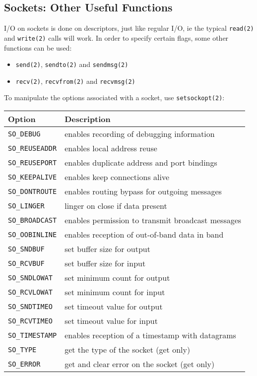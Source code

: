\documentclass[xga]{xdvislides}
\begin{document}
\subsection{Sockets: Other Useful Functions}

I/O on sockets is done on descriptors, just like regular I/O, ie the typical
{\tt read(2)} and {\tt write(2)} calls will work.  In order to specify certain
flags, some other functions can be used:

\begin{itemize}
	\item {\tt send(2)}, {\tt sendto(2)} and {\tt sendmsg(2)}
	\item {\tt recv(2)}, {\tt recvfrom(2)} and {\tt recvmsg(2)}
\end{itemize}
To manipulate the options associated with a socket, use {\tt setsockopt(2)}:
\small
\begin{tabular}{| l | l |}
	\hline
	{\bf Option}		&	{\bf Description} \\
	\hline
	{\tt SO\_DEBUG}		&	enables recording of debugging information \\
	{\tt SO\_REUSEADDR}	&	enables local address reuse \\
	{\tt SO\_REUSEPORT}	&	enables duplicate address and port bindings \\
	{\tt SO\_KEEPALIVE}	&	enables keep connections alive\\
	{\tt SO\_DONTROUTE}	&	enables routing bypass for outgoing messages\\
	{\tt SO\_LINGER}	&	linger on close if data present\\
	{\tt SO\_BROADCAST}	&	enables permission to transmit broadcast messages\\
	{\tt SO\_OOBINLINE}	&	enables reception of out-of-band data in band\\
	{\tt SO\_SNDBUF}	&	set buffer size for output\\
	{\tt SO\_RCVBUF}	&	set buffer size for input\\
	{\tt SO\_SNDLOWAT}	&	set minimum count for output\\
	{\tt SO\_RCVLOWAT}	&	set minimum count for input\\
	{\tt SO\_SNDTIMEO}	&	set timeout value for output\\
	{\tt SO\_RCVTIMEO}	&	set timeout value for input\\
	{\tt SO\_TIMESTAMP}	&	enables reception of a timestamp with datagrams\\
	{\tt SO\_TYPE}		&	get the type of the socket (get only)\\
	{\tt SO\_ERROR}		&	get and clear error on the socket (get only)\\
	\hline
\end{tabular}
\Normalsize
\end{document}
